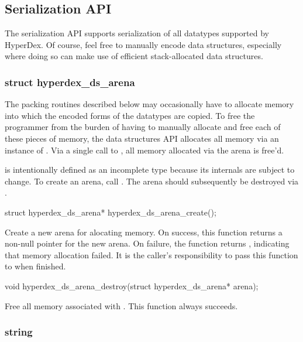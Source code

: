\subsection{Serialization API}

The serialization API supports serialization of all datatypes supported by
HyperDex.  Of course, feel free to manually encode data structures, especially
where doing so can make use of efficient stack-allocated data structures.

\subsubsection{struct hyperdex\_ds\_arena}

The packing routines described below may occasionally have to allocate memory
into which the encoded forms of the datatypes are copied.  To free the
programmer from the burden of having to manually allocate and free each of these
pieces of memory, the data structures API allocates all memory via an instance
of .  Via a single call to
, all memory allocated via the arena is
free'd.

 is intentionally defined as an incomplete type
because its internals are subject to change.  To create an arena, call
.  The arena should subsequently be destroyed
via .

\begin{ccode}
struct hyperdex_ds_arena* hyperdex_ds_arena_create();
\end{ccode}
\funcdesc Create a new arena for alocating memory.  On success, this function
returns a non-null pointer for the new arena.  On failure, the function returns
, indicating that memory allocation failed.  It is the caller's
responsibility to pass this function to  when
finished.

\funcsep
\begin{ccode}
void hyperdex_ds_arena_destroy(struct hyperdex_ds_arena* arena);
\end{ccode}
\funcdesc Free all memory associated with .  This function always
succeeds.

\subsubsection{string}


